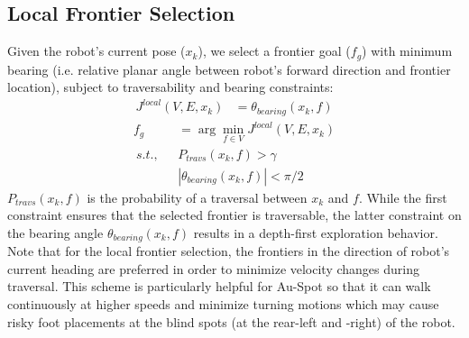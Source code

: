 \documentclass[letterpaper, 10pt, conference]{ieeeconf}      %
\begin{document}
\subsection{Local Frontier Selection}
Given the robot's current pose ($x_k$), we select a frontier goal ($f_g$) with minimum bearing (i.e. relative planar angle between robot's forward direction and frontier location), subject to traversability and bearing constraints:
\begin{align}
    J^{local}(V, E, x_k) &= \theta_{bearing}(x_k, f) 
\end{align}
\begin{align}
    f_g &= \arg\min_{f\in V} J^{local}(V, E, x_k)\\
    ~s.t.,~~~ & P_{travs}(x_k, f) > \gamma \nonumber \\
    & |\theta_{bearing}(x_k, f)| < \pi/2 \nonumber
\end{align}
$P_{travs}(x_k, f)$ is the probability of a traversal between $x_k$ and $f$. 
While the first constraint ensures that the selected frontier is traversable, the latter constraint on the bearing angle $\theta_{bearing}(x_k, f)$ results in a depth-first exploration behavior. 
Note that for the local frontier selection, the frontiers in the direction of robot's current heading are preferred in order to minimize velocity changes during traversal. This scheme is particularly helpful for Au-Spot so that it can walk continuously at higher speeds and minimize turning motions which may cause risky foot placements at the blind spots (at the rear-left and -right) of the robot.
\end{document}
